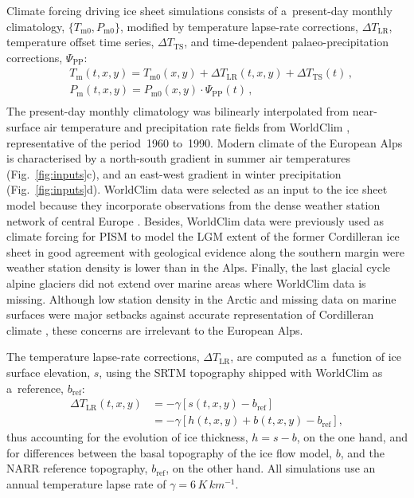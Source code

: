 \documentclass[tc, manuscript]{copernicus}
\begin{document}
    Climate forcing driving ice sheet simulations consists of a~present-day
    monthly climatology, $\{T_{\mathrm{m}0}, P_{\mathrm{m}0}\}$, modified by
    temperature lapse-rate corrections, ${\Delta}T_{\text{LR}}$, temperature
    offset time series, ${\Delta}T_{\text{TS}}$, and time-dependent
    palaeo-precipitation corrections, $\Psi_{\text{PP}}$:
    \begin{align}
      &T_{\mathrm{m}}(t, x, y) = T_{\mathrm{m}0}(x, y) +
                                 {\Delta}T_{\text{LR}}(t, x, y) +
                                 {\Delta}T_{\text{TS}}(t) \,, \\
      &P_{\mathrm{m}}(t, x, y) = P_{\mathrm{m}0}(x, y) \cdot
                                 {\Psi}_{\text{PP}}(t) \,, \\
    \end{align}
    The present-day monthly climatology was bilinearly interpolated from
    near-surface air temperature and precipitation rate fields from
    WorldClim \citep{Hijmans.etal.2005}, representative of the period~1960
    to~1990. Modern climate of the European Alps is characterised by a
    north-south gradient in summer air temperatures (Fig.~\ref{fig:inputs}c),
    and an east-west gradient in winter precipitation (Fig.~\ref{fig:inputs}d).
    WorldClim data
    were selected as an input to the ice sheet model because they incorporate
    observations from the dense weather station network of central Europe
    \citep[Fig.~1]{Hijmans.etal.2005}. Besides, WorldClim data were
    previously used as climate forcing for PISM to model the LGM extent of the
    former Cordilleran ice sheet in good agreement with geological evidence
    along the southern margin \citep{Seguinot.etal.2014} were weather station
    density is lower than in the Alps. Finally, the last glacial cycle alpine
    glaciers did not extend over marine areas where WorldClim data is missing.
    Although low station density in the Arctic and missing data on marine
    surfaces were major setbacks against accurate representation of Cordilleran
    climate \citep{Seguinot.etal.2014}, these concerns are irrelevant to the
    European Alps.

    The temperature lapse-rate corrections, ${\Delta}T_{\text{LR}}$, are
    computed as a~function of ice surface elevation, $s$, using the SRTM
    topography shipped with WorldClim as a~reference, $b_{\text{ref}}$:
    \begin{align}
      {\Delta}T_{\text{LR}}(t, x, y) &= -\gamma [s(t, x, y)-b_{\text{ref}}] \\
                                     &= -\gamma [h(t, x, y)+
                                                 b(t, x, y)-b_{\text{ref}}],
    \end{align}
    thus accounting for the evolution of ice thickness, ${h=s-b}$, on the one
    hand, and for differences between the basal topography of the ice flow
    model, $b$, and the NARR reference topography, $b_{\text{ref}}$, on the
    other hand. All simulations use an annual temperature lapse rate of
    $\gamma=6\,\unit{K\,km^{-1}}$.
\end{document}

